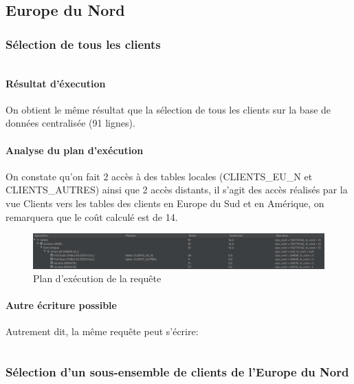 \documentclass[10pt,a4paper]{article}
\theoremstyle{plain}
\begin{document}
\subsection{Europe du Nord}

\subsubsection{Sélection de tous les clients}

\inputminted{sql}{INSA-DB12-EuropeNord-req1.sql}

\paragraph{Résultat d'éxecution}

On obtient le même résultat que la sélection de tous les clients sur la base de données centralisée (91 lignes).

\paragraph{Analyse du plan d'exécution}

On constate qu'on fait 2 accès à des tables locales (CLIENTS\_EU\_N et CLIENTS\_AUTRES) ainsi que 2 accès distants, il s'agit des accès réalisés par la vue Clients vers les tables des clients en Europe du Sud et en Amérique, on remarquera que le coût calculé est de 14.

\begin{figure}[H]
    \centering
    \includegraphics[width=15cm]{INSA-DB12-EuropeNord-plan-exec-vues-distante1.png}
    \caption{Plan d'exécution de la requête}
\end{figure}

\paragraph{Autre écriture possible}

Autrement dit, la même requête peut s'écrire:
\inputminted{sql}{INSA-DB12-EuropeNord-req1-bis.sql}

\subsubsection{Sélection d'un sous-ensemble de clients de l'Europe du Nord}
\end{document}
